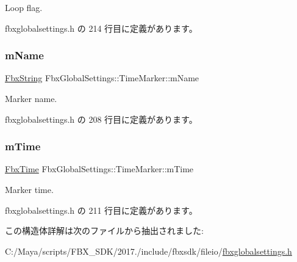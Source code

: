 Loop flag. 



 fbxglobalsettings.\+h の 214 行目に定義があります。

\mbox{\label{struct_fbx_global_settings_1_1_time_marker_a625789fde7114541d6620bb21e5a3b23}} 
\subsubsection{\texorpdfstring{m\+Name}{mName}}
{\footnotesize\ttfamily \hyperlink{class_fbx_string}{Fbx\+String} Fbx\+Global\+Settings\+::\+Time\+Marker\+::m\+Name}



Marker name. 



 fbxglobalsettings.\+h の 208 行目に定義があります。

\mbox{\label{struct_fbx_global_settings_1_1_time_marker_abd5a09781e525fb49ba07310d03f1d9a}} 
\subsubsection{\texorpdfstring{m\+Time}{mTime}}
{\footnotesize\ttfamily \hyperlink{class_fbx_time}{Fbx\+Time} Fbx\+Global\+Settings\+::\+Time\+Marker\+::m\+Time}



Marker time. 



 fbxglobalsettings.\+h の 211 行目に定義があります。



この構造体詳解は次のファイルから抽出されました\+:\begin{DoxyCompactItemize}
\item 
C\+:/\+Maya/scripts/\+F\+B\+X\+\_\+\+S\+D\+K/2017./include/fbxsdk/fileio/\hyperlink{fbxglobalsettings_8h}{fbxglobalsettings.\+h}\end{DoxyCompactItemize}
